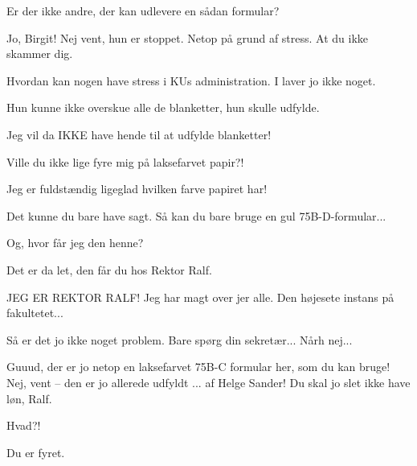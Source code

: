 \documentclass[a4paper,11pt]{article}
\begin{document}
\begin{sketch}
  Er der ikke andre, der kan udlevere en sådan formular?

 Jo, Birgit! Nej vent, hun er stoppet. Netop på grund af stress. At du ikke 
skammer dig.

 Hvordan kan nogen have stress i KUs administration. I laver jo ikke 
noget.

 Hun kunne ikke overskue alle de blanketter, hun skulle udfylde.

 Jeg vil da IKKE have hende til at udfylde blanketter!

 Ville du ikke lige fyre mig på laksefarvet papir?!

 Jeg er fuldstændig ligeglad hvilken farve papiret har!

 Det kunne du bare have sagt. Så kan du bare bruge en gul 
75B-D-formular...

 Og, hvor får jeg den henne?

 Det er da let, den får du hos Rektor Ralf.

 JEG ER REKTOR RALF!  Jeg har magt over jer alle. 
Den højesete instans på fakultetet... 

 Så er det jo ikke noget problem. Bare spørg din sekretær... Nårh nej...


 Guuud, der er jo netop en laksefarvet 75B-C formular her, som du kan bruge! Nej, vent -- den er jo allerede udfyldt ... af Helge Sander! 
Du skal jo slet ikke have løn, Ralf.

 Hvad?!

  Du er fyret.


\end{sketch}
\end{document}
